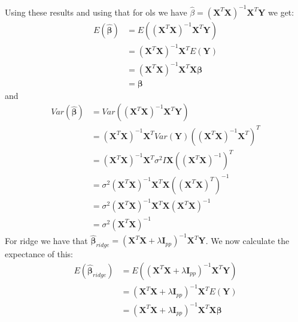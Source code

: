 \documentclass{article}
\begin{document}
Using these results and using that for ols we have $\hat{\beta} = (\mathbf{X}^T
    \mathbf{X})^{-1} \mathbf{X}^T \mathbf{Y}$ we get:
\begin{align*}
    E(\hat{\bm{\beta}}) & = E((\mathbf{X}^T \mathbf{X})^{-1} \mathbf{X}^T \mathbf{Y})         \\
                        & = (\mathbf{X}^T \mathbf{X})^{-1} \mathbf{X}^T E(\mathbf{Y})         \\
                        & = (\mathbf{X}^T \mathbf{X})^{-1} \mathbf{X}^T \mathbf{X} \bm{\beta} \\
                        & = \bm{\beta}
\end{align*}
and
\begin{align*}
    Var(\hat{\bm{\beta}}) & = Var((\mathbf{X}^T \mathbf{X})^{-1} \mathbf{X}^T \mathbf{Y})                                                              \\
                          & = (\mathbf{X}^T \mathbf{X})^{-1} \mathbf{X}^T Var(\mathbf{Y}) \left( (\mathbf{X}^T \mathbf{X})^{-1} \mathbf{X}^T \right)^T \\
                          & = (\mathbf{X}^T \mathbf{X})^{-1} \mathbf{X}^T \sigma^2 I \mathbf{X} \left( (\mathbf{X}^T \mathbf{X})^{-1} \right)^T        \\
                          & = \sigma^2 (\mathbf{X}^T \mathbf{X})^{-1} \mathbf{X}^T \mathbf{X} \left((\mathbf{X}^T \mathbf{X})^T \right)^{-1}           \\
                          & = \sigma^2 (\mathbf{X}^T \mathbf{X})^{-1} \mathbf{X}^T \mathbf{X} (\mathbf{X}^T \mathbf{X})^{-1}                           \\
                          & = \sigma^2 (\mathbf{X}^T \mathbf{X})^{-1}
\end{align*}
For ridge we have that $\hat{\bm{\beta}}_{ridge} = (\mathbf{X}^T \mathbf{X} + \lambda
    \mathbf{I}_{p p})^{-1} \mathbf{X}^T \mathbf{Y}$. We now calculate the expectance
of this:
\begin{align*}
    E(\hat{\bm{\beta}}_{ridge}) & = E((\mathbf{X}^T \mathbf{X} + \lambda \mathbf{I}_{p p})^{-1} \mathbf{X}^T \mathbf{Y})         \\
                                & = (\mathbf{X}^T \mathbf{X} + \lambda \mathbf{I}_{p p})^{-1} \mathbf{X}^T E(\mathbf{Y})         \\
                                & = (\mathbf{X}^T \mathbf{X} + \lambda \mathbf{I}_{p p})^{-1} \mathbf{X}^T \mathbf{X} \bm{\beta}
\end{align*}
\end{document}
